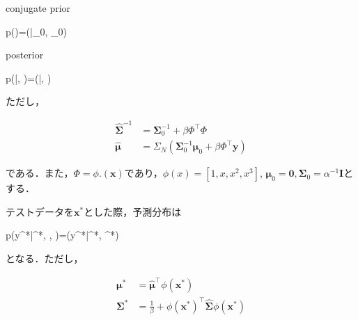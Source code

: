 conjugate prior


p()=(|\boldsymbol{\mu}_0, \mathbf{\Sigma}_0)


posterior


p(|, )=(|\hat{\boldsymbol{\mu}}, \hat{\mathbf{\Sigma}})


ただし，


\begin{align}
\hat{\mathbf{\Sigma}}^{-1}&= \mathbf{\Sigma}_0^{-1}+ \beta \Phi^\top\Phi\\
\hat{\boldsymbol{\mu}}&=\Sigma_N (\mathbf{\Sigma}_0^{-1}\boldsymbol{\mu}_0+\beta \Phi^\top \mathbf{y})
\end{align}


である．また，$\Phi=\phi.(\mathbf{x})$であり，$\phi(x)=[1, x, x^2, x^3]$, $\boldsymbol{\mu}_0=\mathbf{0}, \mathbf{\Sigma}_0= \alpha^{-1} \mathbf{I}$とする．

テストデータを$\mathbf{x}^*$とした際，予測分布は


p(y^*|^*, , )=(y^*|\boldsymbol{\mu}^*, \mathbf{\Sigma}^*)


となる．ただし，


\begin{align}
\boldsymbol{\mu}^*&=\hat{\boldsymbol{\mu}}^\top \phi(\mathbf{x}^*)\\
\mathbf{\Sigma}^* &= \frac{1}{\beta} +  \phi(\mathbf{x}^*)^\top\hat{\mathbf{\Sigma}}\phi(\mathbf{x}^*)\\
\end{align}
